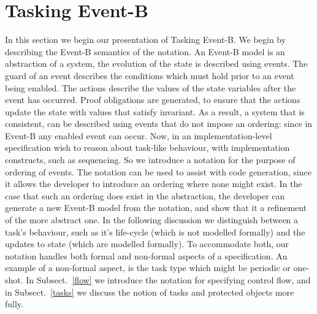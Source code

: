\section{Tasking Event-B}\label{TEB}
In this section we begin our presentation of Tasking Event-B. We begin by describing the Event-B semantics of the notation. An Event-B model is an abstraction of a system, the evolution of the state is described using events. The guard of an event describes the conditions which must hold prior to an event being enabled. The actions describe the values of the state variables after the event has occurred. Proof obligations are generated, to ensure that the actions update the state with values that satisfy invariant. As a result, a system that is consistent, can be described using events that do not impose an ordering: since in Event-B any enabled event can occur. Now, in an implementation-level specification wish to reason about task-like behaviour, with implementation constructs, such as sequencing. So we introduce a notation for the purpose of ordering of events. The notation can be used to assist with code generation, since it allows the developer to introduce an ordering where none might exist. In the case that such an ordering does exist in the abstraction, the developer can generate a new Event-B model from the notation, and show that it a refinement of the more abstract one. In the following discussion we distinguish between a task's behaviour, such as it's life-cycle (which is not modelled formally) and the updates to state (which are modelled formally). To accommodate both, our notation handles both formal and non-formal aspects of a specification. An example of a non-formal aspect, is the task type which might be periodic or one-shot.  In Subsect.~\ref{flow} we introduce the notation for specifying control flow, and in Subsect.~\ref{tasks} we discuss the notion of tasks and protected objects more fully.


